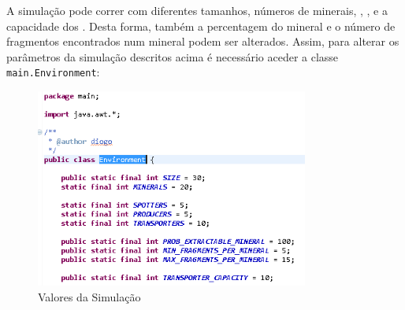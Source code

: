\documentclass[12pt]{report}
\begin{document}
A simulação pode correr com diferentes tamanhos, números de minerais, \spotters, \producers, \transporters e a capacidade dos \transporters. Desta forma, também a  percentagem do mineral e o número de fragmentos encontrados num mineral podem ser alterados.
Assim, para alterar os parâmetros da simulação descritos acima é necessário aceder a classe \java \texttt{main.Environment}:

\begin{figure}[h]
	\centering
	\includegraphics[width=0.8\textwidth]{javaEnvironment}
	\caption{Valores da Simulação}
	\label{javaEnvironment}
\end{figure}
\end{document}
